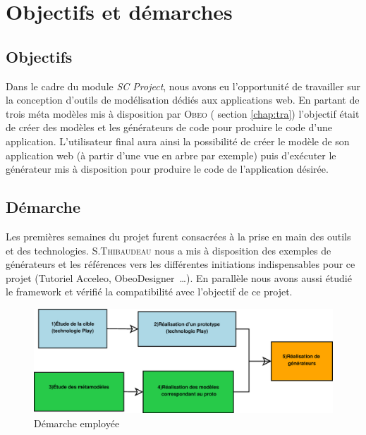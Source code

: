 \chapter{Objectifs et démarches}\label{chap:mod}


\section{Objectifs}
Dans le cadre du module \emph{SC Project}, nous avons eu l'opportunité de travailler sur la conception d'outils de modélisation dédiés aux applications web. En partant de trois méta modèles mis à disposition par \textsc{Obeo}
(\cf{} section \ref{chap:tra}) l'objectif était de créer des modèles et les générateurs de code pour produire le code d'une application. L'utilisateur final aura ainsi la possibilité de créer le modèle de son application web (à partir d'une vue en arbre par exemple) puis d'exécuter le générateur mis à disposition pour produire le code de l'application désirée.



\section{Démarche} 

Les premières semaines du projet furent consacrées à la prise en main des outils et des technologies. S.\textsc{Thibaudeau} nous a mis à disposition des exemples de générateurs et les références vers les différentes initiations indispensables pour ce projet (Tutoriel Acceleo, ObeoDesigner~\dots). En parallèle nous avons aussi étudié le framework \kwplay{} et vérifié la compatibilité avec l'objectif de ce projet.

\begin{figure}[htb]
  \includegraphics[scale=.4]{img/demarche.eps}
  \caption{Démarche employée}
  \label{fig:dem}
\end{figure}

